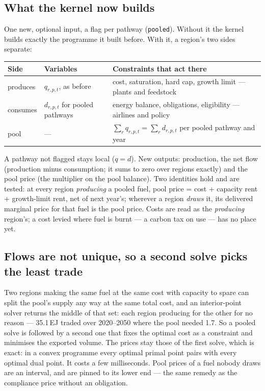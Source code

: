 \documentclass[11pt,a4paper]{article}
\newcommand{\var}[1]{\texttt{\small #1}}
\begin{document}
\subsection{What the kernel now builds}

One new, optional input, a flag per pathway (\var{pooled}). Without it the kernel builds exactly
the programme it built before. With it, a region's two sides separate:

\begin{center}\small
\begin{tabular}{@{}lp{4.4cm}p{7.0cm}@{}}
\toprule
\textbf{Side} & \textbf{Variables} & \textbf{Constraints that act there} \\
\midrule
produces & $q_{r,p,t}$, as before & cost, saturation, hard cap, growth limit --- plants and feedstock \\
consumes & $d_{r,p,t}$ for pooled pathways & energy balance, obligations, eligibility --- airlines and policy \\
pool & --- & $\sum_r q_{r,p,t} = \sum_r d_{r,p,t}$ per pooled pathway and year \\
\bottomrule
\end{tabular}
\end{center}

\noindent A pathway not flagged stays local ($q = d$). New outputs: production, the net flow
(production minus consumption; it sums to zero over regions exactly) and the pool price (the
multiplier on the pool balance). Two identities hold and are tested: at every region
\emph{producing} a pooled fuel, pool price = cost + capacity rent + growth-limit rent, net of
next year's; wherever a region \emph{draws} it, its delivered marginal price for that fuel is
the pool price. Costs are read as the \emph{producing} region's; a cost levied where fuel is
burnt --- a carbon tax on use --- has no place yet.

\subsection{Flows are not unique, so a second solve picks the least trade}

Two regions making the same fuel at the same cost with capacity to spare can split the pool's
supply any way at the same total cost, and an interior-point solver returns the middle of that
set: each region producing for the other for no reason --- 35.1\,EJ traded over 2020--2050 where
the pool needed 1.7. So a pooled solve is followed by a second one that fixes the optimal cost
as a constraint and minimises the exported volume. The prices stay those of the first solve,
which is exact: in a convex programme every optimal primal point pairs with every optimal dual
point. It costs a few milliseconds. Pool prices of a fuel nobody draws are an interval, and are
pinned to its lower end --- the same remedy as the compliance price without an obligation.
\end{document}
